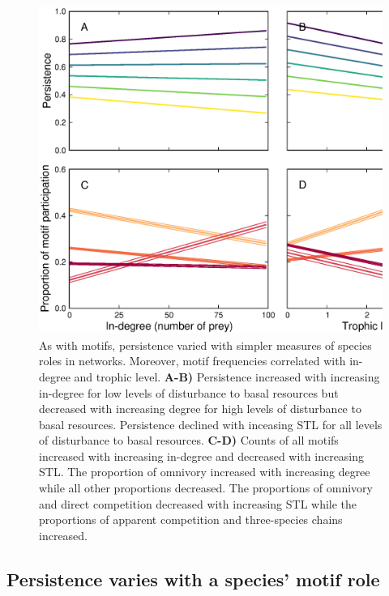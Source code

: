 \documentclass[12pt]{article}
\begin{document}
\begin{spacing}{2.0}
            \begin{figure}
                \centering
                \includegraphics[width=\textwidth]{figures/roles_vs_TL.eps}
                \caption{As with motifs, persistence varied with simpler measures of species roles in networks. Moreover, motif frequencies correlated with in-degree and trophic level. \textbf{A-B)} Persistence increased with increasing in-degree for low levels of disturbance to basal resources but decreased with increasing degree for high levels of disturbance to basal resources.
                Persistence declined with inceasing STL for all levels of disturbance to basal resources.
                \textbf{C-D)} Counts of all motifs increased with increasing in-degree and decreased with increasing STL. The proportion of omnivory increased with increasing degree while all other proportions decreased. The proportions of omnivory and direct competition decreased with increasing STL while the proportions of apparent competition and three-species chains increased.}
                \label{fig:motifs_vs_TL_and_deg}
            \end{figure}        
        

    \subsection*{Persistence varies with a species' motif role}


\end{spacing}
\end{document}
